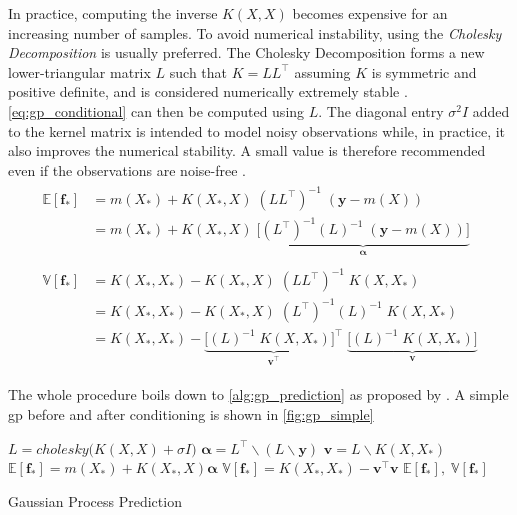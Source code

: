 In practice, computing the inverse $K(X, X)$ becomes expensive for an increasing number of samples. To avoid numerical instability, using the \textit{Cholesky Decomposition} is usually preferred. The Cholesky Decomposition forms a new lower-triangular matrix $L$ such that $K = L L^\intercal$ assuming $K$ is symmetric and positive definite, and is considered numerically extremely stable \cite{rasmussen}. \cref{eq:gp_conditional} can then be computed using $L$. The diagonal entry $\sigma^2 I$ added to the kernel matrix is intended to model noisy observations while, in practice, it also improves the numerical stability. A small value is therefore recommended even if the observations are noise-free \cite{scikit-learn}.
\begin{subequations}
\begin{align}
    \begin{split}
    \mathbb{E}[{\boldsymbol{f}}_*] &= m(X_*) + K(X_*, X) \; (L L^\intercal)^{-1} \; (\boldsymbol{y} - m(X))\\ &= m(X_*) + K(X_*, X) \; \underbrace{\big[(L^\intercal)^{-1} (L)^{-1}  \; (\boldsymbol{y} - m(X))\big]}_{\boldsymbol{\alpha}}
    \end{split}\\
    \begin{split}
    \mathbb{V}[\boldsymbol{f}_*] &= K(X_*, X_*) - K(X_*, X) \; (L L^\intercal)^{-1} \; K(X, X_*)\\
    &= K(X_*, X_*) - K(X_*, X) \; (L^\intercal)^{-1} (L)^{-1} \; K(X, X_*)\\
    &= K(X_*, X_*) - \underbrace{\big[(L)^{-1} \; K(X, X_*)\big]^\intercal}_{\boldsymbol{v^\intercal}} \; \underbrace{\big[(L)^{-1} \; K(X, X_*)\big]}_{\boldsymbol{v}}
    \end{split}
\end{align}
\end{subequations}

The whole procedure boils down to \cref{alg:gp_prediction} as proposed by \cite{rasmussen}. A simple \acrshort{gp} before and after conditioning is shown in \cref{fig:gp_simple}

\begin{algorithm}[H]
\begin{algorithmic}[1]
    \State $L = cholesky\big(K(X, X) + \sigma I\big)$
    \State $\boldsymbol{\alpha} = L^\intercal \backslash (L \backslash \boldsymbol{y})$
    \State $\boldsymbol{v} = L \backslash K(X, X_*)$
    \State $\mathbb{E}[\boldsymbol{f}_*] = m(X_*) + K(X_*, X) \boldsymbol{\alpha}$
    \State $\mathbb{V}[\boldsymbol{f}_*] = K(X_*, X_*) - \boldsymbol{v}^\intercal \boldsymbol{v}$
    \State \Return $\mathbb{E}[\boldsymbol{f}_*], \; \mathbb{V}[\boldsymbol{f}_*]$
\EndProcedure
\end{algorithmic}
\caption{Gaussian Process Prediction}
\label{alg:gp_prediction}
\end{algorithm}

